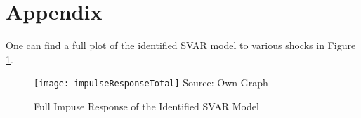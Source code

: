\section{Appendix}\label{Appendix}
One can find a full plot of the identified SVAR model to various shocks in Figure \ref{response}. 
\begin{figure}[H]
    \centering
    \caption[]{Full Impuse Response of the Identified SVAR Model}\label{response}
    \texttt{[image: impulseResponseTotal]}
    Source: Own Graph
\end{figure}